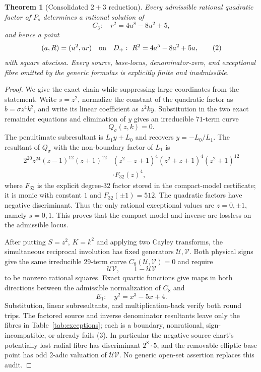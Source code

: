 \documentclass[11pt]{article}
\newtheorem{theorem}{Theorem}
\begin{document}
\begin{theorem}[Consolidated $2+3$ reduction]\label{thm:reduction}
Every admissible rational quadratic factor of $P_s$ determines a rational
solution of
\[
 C_3:\quad r^2=4u^8-8u^2+5,                         \tag{1}
\]
and hence a point
\[
 (a,R)=(u^2,ur)
\quad\hbox{on}\quad
 D_+:\ R^2=4a^5-8a^2+5a,                            \tag{2}
\]
with square abscissa.  Every source, base-locus, denominator-zero, and
exceptional fibre omitted by the generic formulas is explicitly finite and
inadmissible.
\end{theorem}

\begin{proof}
We give the exact chain while suppressing large coordinates from the
statement.  Write $s=z^2$, normalize the constant of the quadratic factor as
$b=\sigma z^4k^2$, and write its linear coefficient as $z^2ky$.
Substitution in the two exact remainder equations and elimination of $y$
gives an irreducible $71$-term curve
\[
 Q_\sigma(z,k)=0.
\]
The penultimate subresultant is $L_1y+L_0$ and recovers
$y=-L_0/L_1$.  The resultant of $Q_\sigma$ with the non-boundary factor of
$L_1$ is
\[
\begin{aligned}
2^{20}z^{24}(z-1)^{12}(z+1)^{12}
 &(z^2-z+1)^4(z^2+z+1)^4(z^2+1)^{12}\\
 &\cdot F_{32}(z)^4,
\end{aligned}
\]
where $F_{32}$ is the explicit degree-$32$ factor stored in the compact-model
certificate; it is monic with constant $1$ and $F_{32}(\pm1)=512$.  The
quadratic factors have negative discriminant.  Thus the only rational
exceptional values are $z=0,\pm1$, namely $s=0,1$.  This proves that the
compact model and inverse are lossless on the admissible locus.

After putting $S=z^2$, $K=k^2$ and applying two Cayley transforms, the
simultaneous reciprocal involution has fixed generators
$\mathcal U,\mathcal V$.  Both physical signs give the same irreducible
$29$-term curve $C_8(\mathcal U,\mathcal V)=0$ and require
\[
 \mathcal U\mathcal V,\qquad 1-\mathcal U\mathcal V       \tag{3}
\]
to be nonzero rational squares.  Exact quartic functions give maps in both
directions between the admissible normalization of $C_8$ and
\[
 E_1:\quad y^2=x^3-5x+4.                                \tag{4}
\]
Substitution, linear subresultants, and multiplication-back verify both
round trips.  The factored source and inverse denominator resultants leave
only the fibres in Table~\ref{tab:exceptions}; each is a boundary,
nonrational, sign-incompatible, or already fails (3).  In particular the
negative source chart's potentially lost radial fibre has discriminant
$2^8\cdot5$, and the removable elliptic base point has odd $2$-adic
valuation of $\mathcal U\mathcal V$.  No generic open-set assertion replaces
this audit.


\end{proof}
\end{document}
